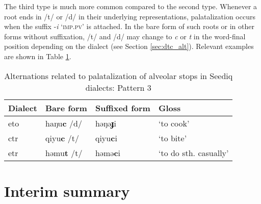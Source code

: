 The third type is much more common compared to the second type. Whenever a root ends in /t/ or /d/ in their underlying representations, palatalization occurs when the suffix -\textit{i} `\textsc{imp.pv}' is attached. In the bare form of such roots or in other forms without suffixation, /t/ and /d/ may change to \textit{c} or \textit{t} in the word-final position depending on the dialect (see Section \ref{sec:dtc_alt}). Relevant examples are shown in Table \ref{tab:cjtd_alt_3}.

\begin{table}[!htbp]
\centering
\caption{Alternations related to palatalization of alveolar stops in Seediq dialects: Pattern 3}
\label{tab:cjtd_alt_3}
\begin{tabular}{llll}
\hline
Dialect   & Bare form & Suffixed form & Gloss                 \\ \hline
\acl{eto} & haŋu\textbf{c} /d/    & həŋə\textbf{ɟ}i       & `to cook'             \\
\acl{ctr} & qiyu\textbf{c} /t/    & qiyu\textbf{c}i       & `to bite'             \\
\acl{etr} & həmu\textbf{t} /t/    & həmə\textbf{c}i       & `to do sth. casually' \\ \hline
\end{tabular}
\end{table}

\section{Interim summary}
\lipsum[1-2]